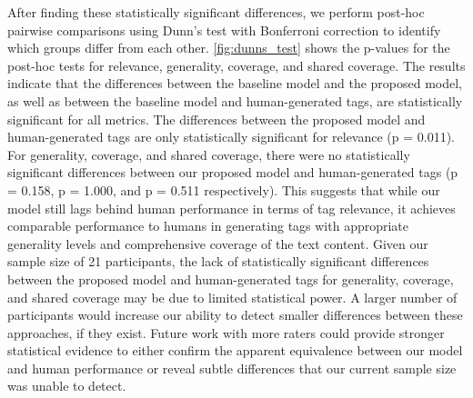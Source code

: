 After finding these statistically significant differences, we perform post-hoc pairwise comparisons using Dunn's test with Bonferroni correction to identify which groups differ from each other. \cref{fig:dunns_test} shows the p-values for the post-hoc tests for relevance, generality, coverage, and shared coverage. The results indicate that the differences between the baseline model and the proposed model, as well as between the baseline model and human-generated tags, are statistically significant for all metrics. The differences between the proposed model and human-generated tags are only statistically significant for relevance (p = 0.011). For generality, coverage, and shared coverage, there were no statistically significant differences between our proposed model and human-generated tags (p = 0.158, p = 1.000, and p = 0.511 respectively). This suggests that while our model still lags behind human performance in terms of tag relevance, it achieves comparable performance to humans in generating tags with appropriate generality levels and comprehensive coverage of the text content. Given our sample size of 21 participants, the lack of statistically significant differences between the proposed model and human-generated tags for generality, coverage, and shared coverage may be due to limited statistical power. A larger number of participants would increase our ability to detect smaller differences between these approaches, if they exist. Future work with more raters could provide stronger statistical evidence to either confirm the apparent equivalence between our model and human performance or reveal subtle differences that our current sample size was unable to detect.

